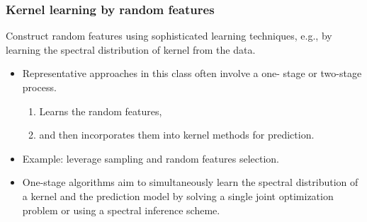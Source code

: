 \begin{frame}
  \frametitle{Kernel learning by random features}

  Construct random features using sophisticated learning techniques, e.g., by learning the spectral distribution
of kernel from the data.

\begin{itemize}
  \item Representative approaches in this class often involve a one-
  stage or two-stage process. 
  \begin{enumerate}
    \item Learns the random features,
    \item and then incorporates them into kernel methods for prediction.
  \end{enumerate}
  \item Example: leverage sampling and random features selection. 
  \item One-stage algorithms aim to simultaneously learn the spectral
  distribution of a kernel and the prediction model by solving a
  single joint optimization problem or using a spectral inference
  scheme. 
\end{itemize}

\end{frame}





